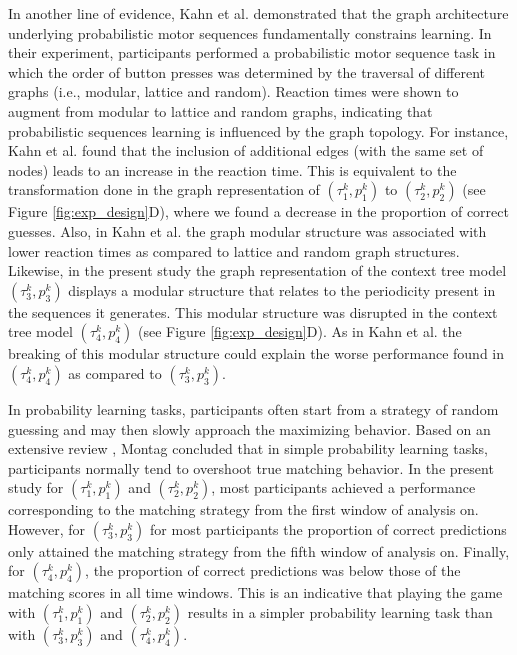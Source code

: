 \documentclass[fleqn,10pt]{wlscirep}
\begin{document}
In another line of evidence, Kahn et al. \cite{Kahn2018} demonstrated that the graph architecture underlying probabilistic motor sequences fundamentally constrains learning. In their experiment, participants performed a probabilistic motor sequence task in which the order of button presses was determined by the traversal of different graphs (i.e., modular, lattice and random). Reaction times were shown to augment from modular to lattice and random graphs, indicating that probabilistic sequences learning is influenced by the graph topology. For instance, Kahn et al. \cite{Kahn2018} found that the inclusion of additional edges (with the same set of nodes) leads to an increase in the reaction time. This is equivalent to the transformation done in the graph representation of $(\tau^k_1, p^k_1)$ to $(\tau^k_2, p^k_2)$ (see Figure \ref{fig:exp_design}D), where we found a decrease in the proportion of correct guesses. Also, in Kahn et al. \cite{Kahn2018} the graph modular structure was associated with lower reaction times as compared to lattice and random graph structures. Likewise, in the present study the graph representation of the context tree model $(\tau^k_3, p^k_3)$ displays a modular structure that relates to the periodicity present in the sequences it generates. This modular structure was disrupted in the context tree model $(\tau^k_4, p^k_4)$ (see Figure \ref{fig:exp_design}D). As in Kahn et al. \cite{Kahn2018} the breaking of this modular structure could explain the worse performance found in $(\tau^k_4, p^k_4)$ as compared to $(\tau^k_3, p^k_3)$.   


In probability learning tasks, participants often start from a strategy of random guessing and may then slowly approach the maximizing behavior. Based on an extensive review \cite{MONTAG2021233}, Montag concluded that in simple probability learning tasks, participants normally tend to overshoot true matching behavior. In the present study for $(\tau^k_1, p^k_1)$ and $(\tau^k_2, p^k_2)$, most participants achieved a performance corresponding to the matching strategy from the first window of analysis on. However, for $(\tau^k_3, p^k_3)$ for most participants the proportion of correct predictions only attained the matching strategy from the fifth window of analysis on. Finally, for $(\tau^k_4, p^k_4)$, the proportion of correct predictions was below those of the matching scores in all time windows. This is an indicative that playing the game with $(\tau^k_1, p^k_1)$ and $(\tau^k_2, p^k_2)$ results in a simpler probability learning task than with $(\tau^k_3, p^k_3)$ and $(\tau^k_4, p^k_4)$.   
\end{document}
